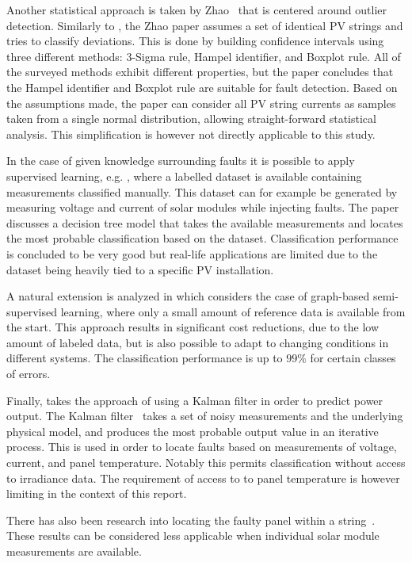 Another statistical approach is taken by Zhao~\cite{Zhao2013outlier} that is centered around outlier detection.
Similarly to \cite{Vergura2008,Vergura2009}, the Zhao paper assumes a set of identical PV strings and tries to classify deviations.
This is done by building confidence intervals using three different methods: 3-Sigma rule, Hampel identifier, and Boxplot rule.
All of the surveyed methods exhibit different properties, but the paper concludes that the Hampel identifier and Boxplot rule are suitable for fault detection.
Based on the assumptions made, the paper can consider all PV string currents as samples taken from a single normal distribution, allowing straight-forward statistical analysis.
This simplification is however not directly applicable to this study.

In the case of given knowledge surrounding faults it is possible to apply supervised learning, e.g. \cite{Zhao2012tree},
where a labelled dataset is available containing measurements classified manually.
This dataset can for example be generated by measuring voltage and current of solar modules while injecting faults.
The paper discusses a decision tree model that takes the available measurements and locates the most probable classification based on the dataset.
Classification performance is concluded to be very good but real-life applications are limited due to the dataset being heavily tied to a specific PV installation.

A natural extension is analyzed in \cite{Zhao2013graph} which considers the case of graph-based semi-supervised learning, where only a small amount of reference data is available from the start.
This approach results in significant cost reductions, due to the low amount of labeled data, but is also possible to adapt to changing conditions in different systems.
The classification performance is up to $99\%$ for certain classes of errors.

Finally, \cite{Kang2012} takes the approach of using a Kalman filter in order to predict power output.
The Kalman filter~\cite{Kang2012} takes a set of noisy measurements and the underlying physical model, and produces the most probable output value in an iterative process.
This is used in order to locate faults based on measurements of voltage, current, and panel temperature.
Notably this permits classification without access to irradiance data.
The requirement of access to to panel temperature is however limiting in the context of this report.

There has also been research into locating the faulty panel within a string~\cite{Lin2012}.
These results can be considered less applicable when individual solar module measurements are available.

